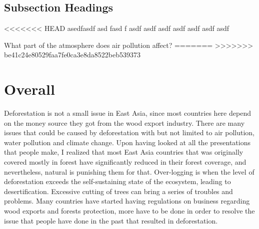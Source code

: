 \documentclass{book}\usepackage{knitr}
\begin{document}
\begin{knitrout}
\begin{kframe}
{\subsection{Subsection Headings} %




<<<<<<< HEAD
asedfasdf asd fasd f asdf asdf asdf asdf asdf asdf asdf

What part of the atmosphere does air pollution affect?
=======
>>>>>>> be41c24e80529faa7fe0ca3e8da8522beb539373

\section{Overall}
Deforestation is not a small issue in East Asia, since most countries here depend on the money source they got from the wood export industry. There are many issues that could be caused by deforestation with but not limited to air pollution, water pollution and climate change. Upon having looked at all the presentations that people make, I realized that most East Asia countries that was originally covered mostly in forest have significantly reduced in their forest coverage, and nevertheless, natural is punishing them for that. Over-logging is when the level of deforestation exceeds the self-sustaining state of the ecosystem, leading to desertification. Excessive cutting of trees can bring a series of troubles and problems. Many countries have started having regulations on business regarding wood exports and forests protection, more have to be done in order to resolve the issue that people have done in the past that resulted in deforestation. 

}
\end{kframe}
\end{knitrout}
\end{document}

